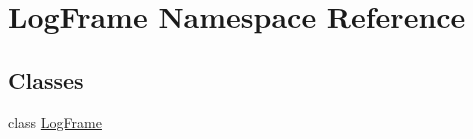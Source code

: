 \hypertarget{namespaceLogFrame}{}\section{Log\+Frame Namespace Reference}
\label{namespaceLogFrame}
\subsection*{Classes}
\begin{DoxyCompactItemize}
\item 
class \hyperlink{classLogFrame_1_1LogFrame}{Log\+Frame}
\end{DoxyCompactItemize}
